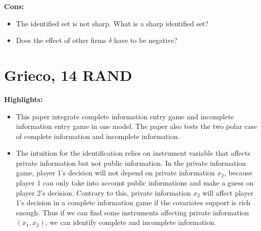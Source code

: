 \documentclass{book}
\theoremstyle{plain}
\theoremstyle{definition}
\newcommand{\red}[1]{{\color{red} #1}}
\newcommand{\mytitle}[1]{{\large{\textbf{#1}}}}
\begin{document}
\vspace{1em}
\noindent
\textbf{Cons:}
\begin{itemize}
	\item The identified set is not sharp. \red{What is a sharp identified set?}

	\item \red{Does the effect of other firms $\delta$ have to be negative?}
\end{itemize}



\section{Grieco, 14 RAND} %
\label{sec:grieco_14_rand}

\textbf{}

\mytitle{Highlights:}
\begin{itemize}
	\item This paper integrate complete information entry game and incomplete information entry game in one model. The paper also tests the two polar case of complete information and incomplete information.

	\item The intuition for the identification relies on instrument variable that affects private information but not public information. In the private information game, player 1's decision will not depend on private information $x_2$, because player 1 can only take into account public informations and make a guess on player 2's decision. 
	Contrary to this, private information $x_2$ will affect player 1's decision in a complete information game if the covariates support is rich enough.
	Thus if we can find some instruments affecting private information $(x_1,x_2)$, we can identify complete and incomplete information. 
\end{itemize}
\end{document}
